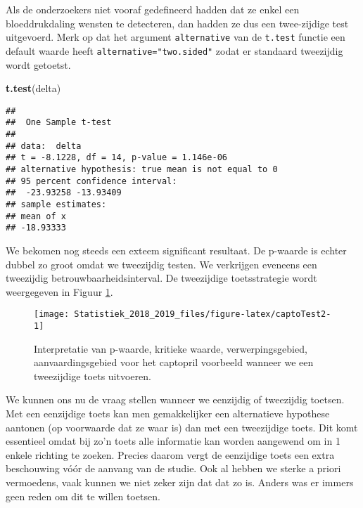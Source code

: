 \documentclass[12pt,dutch,coursenotes]{book}
\newenvironment{Shaded}{\begin{snugshade}}{\end{snugshade}}
\newcommand{\KeywordTok}[1]{\textcolor[rgb]{0.13,0.29,0.53}{\textbf{#1}}}
\newcommand{\NormalTok}[1]{#1}
\theoremstyle{definition}
\theoremstyle{definition}
\theoremstyle{definition}
\theoremstyle{remark}
\begin{document}
Als de onderzoekers niet vooraf gedefineerd hadden dat ze enkel een
bloeddrukdaling wensten te detecteren, dan hadden ze dus een
twee-zijdige test uitgevoerd. Merk op dat het argument
\texttt{alternative} van de \texttt{t.test} functie een default waarde
heeft \texttt{alternative="two.sided"} zodat er standaard tweezijdig
wordt getoetst.

\begin{Shaded}
\begin{Highlighting}[]
\KeywordTok{t.test}\NormalTok{(delta)}
\end{Highlighting}
\end{Shaded}

\begin{verbatim}
## 
##  One Sample t-test
## 
## data:  delta
## t = -8.1228, df = 14, p-value = 1.146e-06
## alternative hypothesis: true mean is not equal to 0
## 95 percent confidence interval:
##  -23.93258 -13.93409
## sample estimates:
## mean of x 
## -18.93333
\end{verbatim}

We bekomen nog steeds een exteem significant resultaat. De p-waarde is
echter dubbel zo groot omdat we tweezijdig testen. We verkrijgen
eveneens een tweezijdig betrouwbaarheidsinterval. De tweezijdige
toetsstrategie wordt weergegeven in Figuur \ref{fig:captoTest2}.

\begin{figure}

{\centering \texttt{[image: Statistiek\_2018\_2019\_files/figure-latex/captoTest2-1]} 

}

\caption{Interpretatie van p-waarde, kritieke waarde, verwerpingsgebied, aanvaardingsgebied voor het captopril voorbeeld wanneer we een tweezijdige toets uitvoeren.}\label{fig:captoTest2}
\end{figure}

We kunnen ons nu de vraag stellen wanneer we eenzijdig of tweezijdig
toetsen. Met een eenzijdige toets kan men gemakkelijker een alternatieve
hypothese aantonen (op voorwaarde dat ze waar is) dan met een
tweezijdige toets. Dit komt essentieel omdat bij zo'n toets alle
informatie kan worden aangewend om in 1 enkele richting te zoeken.
Precies daarom vergt de eenzijdige toets een extra beschouwing vóór de
aanvang van de studie. Ook al hebben we sterke a priori vermoedens, vaak
kunnen we niet zeker zijn dat dat zo is. Anders was er immers geen reden
om dit te willen toetsen.
\end{document}

